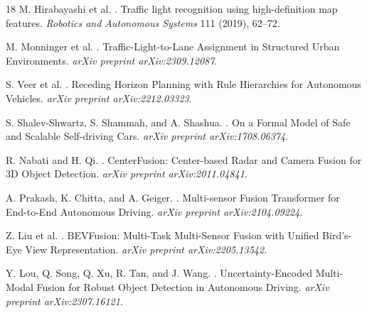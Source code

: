 \documentclass[sigconf,nonacm]{acmart}
\begin{document}
\begin{thebibliography}{18}
M. Hirabayashi et al.
.
\newblock Traffic light recognition using high-definition map features.
\newblock \textit{Robotics and Autonomous Systems} 111 (2019), 62--72.

M. Monninger et al.
.
\newblock Traffic-Light-to-Lane Assignment in Structured Urban Environments.
\newblock \textit{arXiv preprint arXiv:2309.12087}.

S. Veer et al.
.
\newblock Receding Horizon Planning with Rule Hierarchies for Autonomous Vehicles.
\newblock \textit{arXiv preprint arXiv:2212.03323}.

S. Shalev-Shwartz, S. Shammah, and A. Shashua.
.
\newblock On a Formal Model of Safe and Scalable Self-driving Cars.
\newblock \textit{arXiv preprint arXiv:1708.06374}.

R. Nabati and H. Qi.
.
\newblock CenterFusion: Center-based Radar and Camera Fusion for 3D Object Detection.
\newblock \textit{arXiv preprint arXiv:2011.04841}.

A. Prakash, K. Chitta, and A. Geiger.
.
\newblock Multi-sensor Fusion Transformer for End-to-End Autonomous Driving.
\newblock \textit{arXiv preprint arXiv:2104.09224}.

Z. Liu et al.
.
\newblock BEVFusion: Multi-Task Multi-Sensor Fusion with Unified Bird's-Eye View Representation.
\newblock \textit{arXiv preprint arXiv:2205.13542}.

Y. Lou, Q. Song, Q. Xu, R. Tan, and J. Wang.
.
\newblock Uncertainty-Encoded Multi-Modal Fusion for Robust Object Detection in Autonomous Driving.
\newblock \textit{arXiv preprint arXiv:2307.16121}.

\end{thebibliography}
\end{document}
